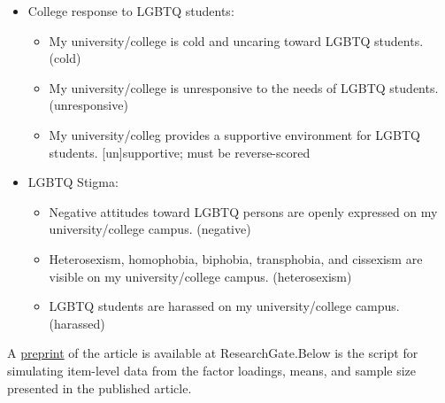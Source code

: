 \documentclass[
  english,
]{book}
\providecommand{\tightlist}{%
  \setlength{\itemsep}{0pt}\setlength{\parskip}{0pt}}
\begin{document}
\begin{itemize}
\tightlist
\item
  College response to LGBTQ students:

  \begin{itemize}
  \tightlist
  \item
    My university/college is cold and uncaring toward LGBTQ students. (cold)
  \item
    My university/college is unresponsive to the needs of LGBTQ students. (unresponsive)
  \item
    My university/colleg provides a supportive environment for LGBTQ students. {[}un{]}supportive; must be reverse-scored
  \end{itemize}
\item
  LGBTQ Stigma:

  \begin{itemize}
  \tightlist
  \item
    Negative attitudes toward LGBTQ persons are openly expressed on my university/college campus. (negative)
  \item
    Heterosexism, homophobia, biphobia, transphobia, and cissexism are visible on my university/college campus. (heterosexism)
  \item
    LGBTQ students are harassed on my university/college campus. (harassed)
  \end{itemize}
\end{itemize}

A \href{https://www.researchgate.net/publication/332062781_Perceptions_of_the_LGBTQ_College_Campus_Climate_Scale_Development_and_Psychometric_Evaluation/link/5ca0bef945851506d7377da7/download}{preprint} of the article is available at ResearchGate.Below is the script for simulating item-level data from the factor loadings, means, and sample size presented in the published article.
\end{document}
